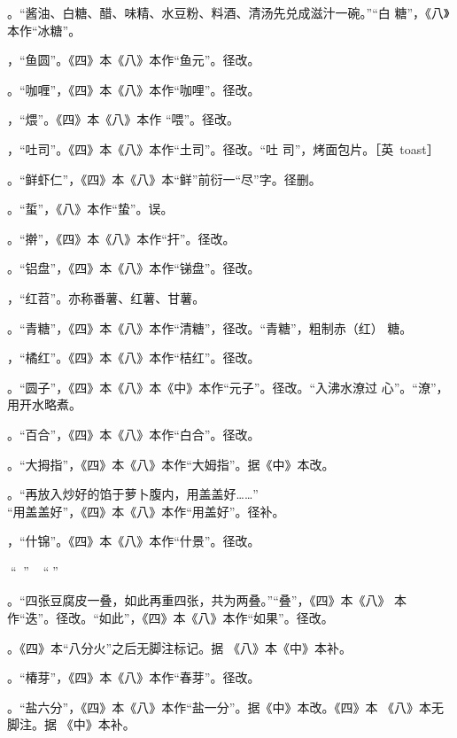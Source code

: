 。“酱油、白糖、醋、味精、水豆粉、料酒、清汤先兑成滋汁一碗。”“白
糖”，《八》本作“冰糖”。

，“鱼圆”。《四》本《八》本作“鱼元”。径改。

。“咖喱”，《四》本《八》本作“咖哩”。径改。

，“煨”。《四》本《八》本作
“喂”。径改。

，“吐司”。《四》本《八》本作“土司”。径改。“吐
司”，烤面包片。［英~toast］

。“鲜虾仁”，《四》本《八》本“鲜”前衍一“尽”字。径删。

。“蜇”，《八》本作“蛰”。误。

。“擀”，《四》本《八》本作“扞”。径改。

。“铝盘”，《四》本《八》本作“锑盘”。径改。

，“红苕”。亦称番薯、红薯、甘薯。

。“青糖”，《四》本《八》本作“清糖”，径改。“青糖”，粗制赤（红）
糖。

，“橘红”。《四》本《八》本作“桔红”。径改。

。“圆子”，《四》本《八》本《中》本作“元子”。径改。“入沸水潦过
心”。“潦”，用开水略煮。

。“百合”，《四》本《八》本作“白合”。径改。

。“大拇指”，《四》本《八》本作“大姆指”。据《中》本改。

。“再放入炒好的馅于萝卜腹内，用盖盖好……”\\%
“用盖盖好”，《四》本《八》本作“用盖好”。径补。

，“什锦”。《四》本《八》本作“什景”。径改。

，“𥑲水”。盐卤。“𥑲”字疑误。

。“四张豆腐皮一叠，如此再重四张，共为两叠。”“叠”，《四》本《八》
本作“迭”。径改。“如此”，《四》本《八》本作“如果”。径改。

。《四》本“八分火”之后无脚注标记{\footnotesize{}}。据
《八》本《中》本补。

。“椿芽”，《四》本《八》本作“春芽”。径改。

。“盐六分”，《四》本《八》本作“盐一分”。据《中》本改。《四》本
《八》本无脚注{\footnotesize{}}。据
《中》本补。

